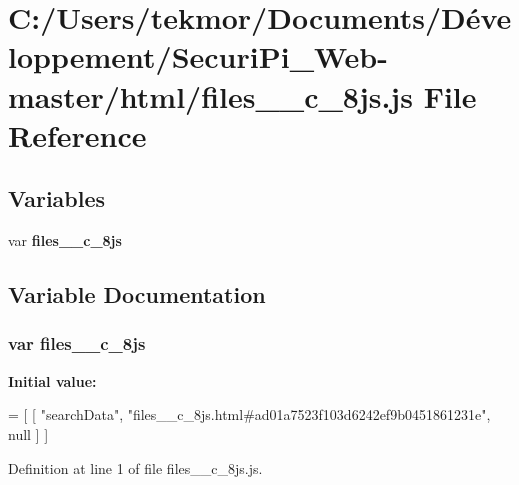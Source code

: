 \section{C\+:/\+Users/tekmor/\+Documents/\+Développement/\+Securi\+Pi\+\_\+\+Web-\/master/html/files\+\_\+\+\_\+c\+\_\+8js.js File Reference}
\label{files____c__8js_8js}
\subsection*{Variables}
\begin{DoxyCompactItemize}
\item 
var {\bf files\+\_\+\+\_\+c\+\_\+8js}
\end{DoxyCompactItemize}


\subsection{Variable Documentation}
\subsubsection[{files\+\_\+\+\_\+c\+\_\+8js}]{\setlength{\rightskip}{0pt plus 5cm}var files\+\_\+\+\_\+c\+\_\+8js}\label{files____c__8js_8js_acccaebca3e0ff6ec53d409c4c6ad9b89}
{\bfseries Initial value\+:}
\begin{DoxyCode}
=
[
    [ \textcolor{stringliteral}{"searchData"}, \textcolor{stringliteral}{"files\_\_c\_8js.html#ad01a7523f103d6242ef9b0451861231e"}, null ]
]
\end{DoxyCode}


Definition at line 1 of file files\+\_\+\+\_\+c\+\_\+8js.\+js.

